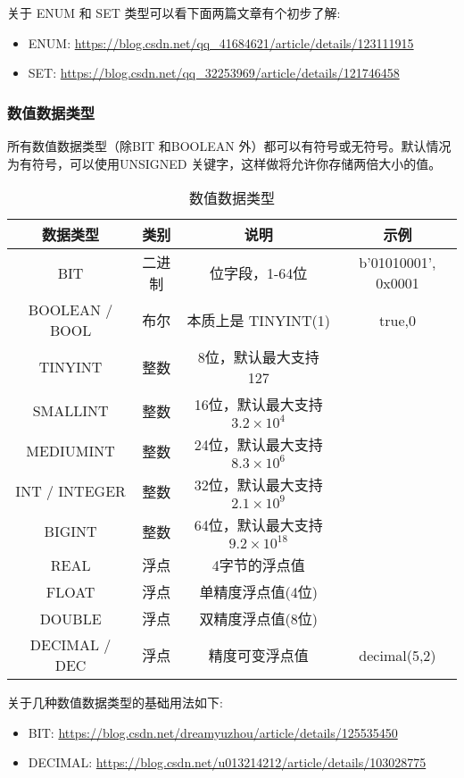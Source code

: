 关于 ENUM 和 SET 类型可以看下面两篇文章有个初步了解:
\begin{itemize}
    \item ENUM: \url{https://blog.csdn.net/qq_41684621/article/details/123111915}
    \item SET: \url{https://blog.csdn.net/qq_32253969/article/details/121746458}
\end{itemize}

\subsubsection{数值数据类型}

所有数值数据类型（除BIT 和BOOLEAN 外）都可以有符号或无符号。默认情况为有符号，可以使用UNSIGNED 关键字，这样做将允许你存储两倍大小的值。

\begin{table}[H]
    \small
    \centering
    \caption{数值数据类型}
    \label{table:数值数据类型}
    \setlength{\tabcolsep}{4mm}
    \begin{tabular}{c|ccc}
        \toprule
        \textbf{数据类型} & \textbf{类别} & \textbf{说明} & \textbf{示例} \\
        \midrule
        BIT & 二进制 & 位字段，1-64位 & b'01010001', 0x0001 \\
        \midrule
        BOOLEAN / BOOL & 布尔 & 本质上是 TINYINT(1) & true,0 \\
        \midrule
        TINYINT & 整数 & 8位，默认最大支持 127&  \\
        SMALLINT & 整数 & 16位，默认最大支持 $ 3.2 \times 10^4$  &  \\
        MEDIUMINT & 整数 & 24位，默认最大支持 $ 8.3 \times 10^6$ &  \\
        INT / INTEGER & 整数 & 32位，默认最大支持 $ 2.1 \times 10^9$ &  \\
        BIGINT & 整数 & 64位，默认最大支持 $ 9.2 \times 10^18$ &  \\
        \midrule
        REAL & 浮点 & 4字节的浮点值 &  \\
        FLOAT & 浮点 & 单精度浮点值(4位) &  \\
        DOUBLE & 浮点 & 双精度浮点值(8位) &  \\
        DECIMAL / DEC & 浮点 & 精度可变浮点值 & decimal(5,2) \\
        \bottomrule
    \end{tabular}
\end{table}

关于几种数值数据类型的基础用法如下:
\begin{itemize}
    \item BIT: \url{https://blog.csdn.net/dreamyuzhou/article/details/125535450}
    \item DECIMAL: \url{https://blog.csdn.net/u013214212/article/details/103028775}
\end{itemize}

